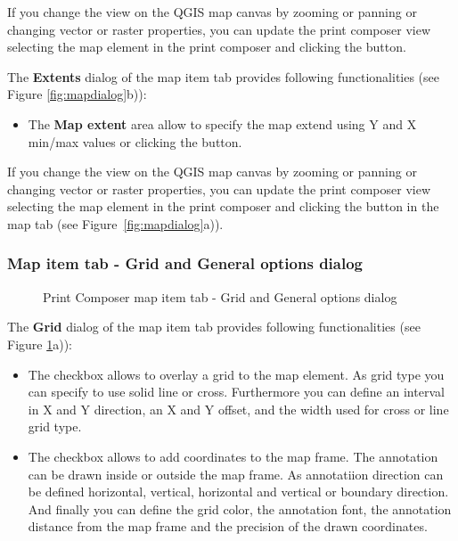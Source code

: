 If you change the view on the QGIS map canvas by zooming or panning or
changing vector or raster properties, you can update the print composer view
selecting the map element in the print composer and clicking the
 button.


The \textbf{Extents} dialog of the map item tab provides following functionalities
(see Figure \ref{fig:mapdialog}b)):

\begin{itemize}
\item The \textbf{Map extent} area allow to specify the map extend using Y
and X min/max values or clicking the  button.
\end{itemize}

If you change the view on the QGIS map canvas by zooming or panning or
changing vector or raster properties, you can update the print composer view
selecting the map element in the print composer and clicking the
 button in the map  tab (see
Figure~\ref{fig:mapdialog}a)).

\subsubsection{Map item tab - Grid and General options dialog}

\begin{figure}[ht]
\centering
\caption{Print Composer map item tab - Grid and General options dialog \nixcaption}\label{fig:sec_map_dialog}
   \goodgap
\end{figure}


The \textbf{Grid} dialog of the map item tab provides following functionalities
(see Figure \ref{fig:sec_map_dialog}a)):

\begin{itemize}
\item The  checkbox allows to overlay a grid to the map
element. As grid type you can specify to use solid line or cross. Furthermore
you can define an interval in X and Y direction, an X and Y offset, and the
width used for cross or line grid type.
\item The  checkbox allows to add coordinates to
the map frame. The annotation can be drawn inside or outside the map frame.
As annotatiion direction can be defined horizontal, vertical, horizontal and
vertical or boundary direction. And finally you can define the grid color,
the annotation font, the annotation distance from the map frame and the
precision of the drawn coordinates.  
\end{itemize}

